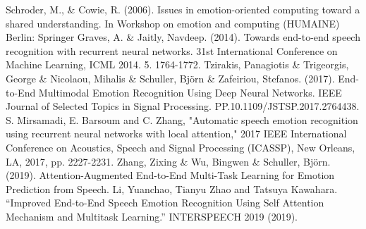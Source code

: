 \documentclass[a4paper,12pt, twoside]{book}
\begin{document}
\begin{thebibliography}{9}
			Schroder, M., \& Cowie, R. (2006). Issues in emotion-oriented computing toward a shared understanding. In Workshop on emotion and computing (HUMAINE)
			Berlin: Springer
			Graves, A. \& Jaitly, Navdeep. (2014). Towards end-to-end speech recognition with recurrent neural networks. 31st International Conference on Machine Learning, ICML 2014. 5. 1764-1772. 
			Tzirakis, Panagiotis \& Trigeorgis, George \& Nicolaou, Mihalis \& Schuller, Björn \& Zafeiriou, Stefanos. 		(2017). End-to-End Multimodal Emotion Recognition Using Deep Neural Networks. IEEE Journal of Selected Topics in Signal Processing. PP.10.1109/JSTSP.2017.2764438. 
			S. Mirsamadi, E. Barsoum and C. Zhang, "Automatic speech emotion recognition using recurrent neural networks with local attention," 2017 IEEE International Conference on Acoustics, Speech and Signal Processing (ICASSP), New Orleans, LA, 2017, pp. 2227-2231.
			Zhang, Zixing \& Wu, Bingwen \& Schuller, Björn. (2019). Attention-Augmented End-to-End Multi-Task Learning for Emotion Prediction from Speech. 
			Li, Yuanchao, Tianyu Zhao and Tatsuya Kawahara. “Improved End-to-End Speech Emotion Recognition Using Self Attention Mechanism and Multitask Learning.” INTERSPEECH 2019 (2019).
	\end{thebibliography}
\end{document}
